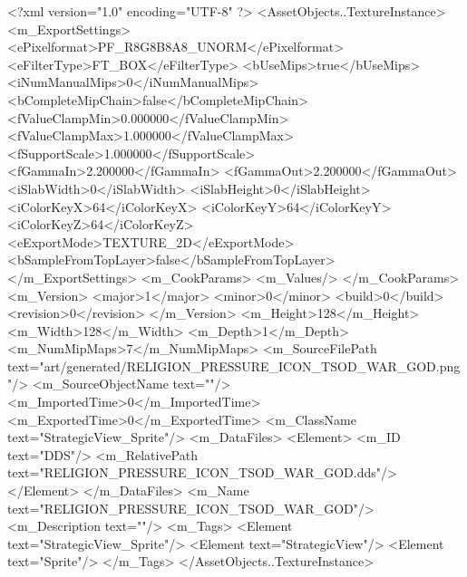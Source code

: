 <?xml version="1.0" encoding="UTF-8" ?>
<AssetObjects..TextureInstance>
	<m_ExportSettings>
		<ePixelformat>PF_R8G8B8A8_UNORM</ePixelformat>
		<eFilterType>FT_BOX</eFilterType>
		<bUseMips>true</bUseMips>
		<iNumManualMips>0</iNumManualMips>
		<bCompleteMipChain>false</bCompleteMipChain>
		<fValueClampMin>0.000000</fValueClampMin>
		<fValueClampMax>1.000000</fValueClampMax>
		<fSupportScale>1.000000</fSupportScale>
		<fGammaIn>2.200000</fGammaIn>
		<fGammaOut>2.200000</fGammaOut>
		<iSlabWidth>0</iSlabWidth>
		<iSlabHeight>0</iSlabHeight>
		<iColorKeyX>64</iColorKeyX>
		<iColorKeyY>64</iColorKeyY>
		<iColorKeyZ>64</iColorKeyZ>
		<eExportMode>TEXTURE_2D</eExportMode>
		<bSampleFromTopLayer>false</bSampleFromTopLayer>
	</m_ExportSettings>
	<m_CookParams>
		<m_Values/>
	</m_CookParams>
	<m_Version>
		<major>1</major>
		<minor>0</minor>
		<build>0</build>
		<revision>0</revision>
	</m_Version>
	<m_Height>128</m_Height>
	<m_Width>128</m_Width>
	<m_Depth>1</m_Depth>
	<m_NumMipMaps>7</m_NumMipMaps>
	<m_SourceFilePath text="art/generated/RELIGION_PRESSURE_ICON_TSOD_WAR_GOD.png"/>
	<m_SourceObjectName text=""/>
	<m_ImportedTime>0</m_ImportedTime>
	<m_ExportedTime>0</m_ExportedTime>
	<m_ClassName text="StrategicView_Sprite"/>
	<m_DataFiles>
		<Element>
			<m_ID text="DDS"/>
			<m_RelativePath text="RELIGION_PRESSURE_ICON_TSOD_WAR_GOD.dds"/>
		</Element>
	</m_DataFiles>
	<m_Name text="RELIGION_PRESSURE_ICON_TSOD_WAR_GOD"/>
	<m_Description text=""/>
	<m_Tags>
		<Element text="StrategicView_Sprite"/>
		<Element text="StrategicView"/>
		<Element text="Sprite"/>
	</m_Tags>
</AssetObjects..TextureInstance>
